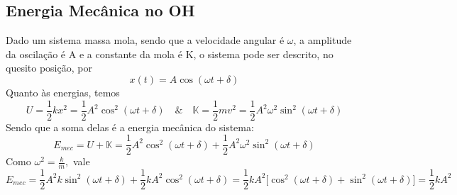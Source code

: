 \documentclass[physicsII_notes.tex]{subfiles}
\begin{document}
\subsection{Energia Mecânica no OH}
Dado um sistema massa mola, sendo que a velocidade angular é \(\omega \), a amplitude da oscilação é A e a constante da mola é K, o sistema pode ser
descrito, no quesito posição, por
\[
	x(t) = A\cos{(\omega t + \delta )}
\]
Quanto às energias, temos
\[
	U = \frac{1}{2}kx^{2} = \frac{1}{2}A^{2}\cos^{2}{(\omega t + \delta )}\quad\&\quad \mathbb{K} = \frac{1}{2}mv^{2} = \frac{1}{2}A^{2}\omega ^{2}\sin^{2}{(\omega t+\delta )}
\]
Sendo que a soma delas é a energia mecânica do sistema:
\[
	E_{mec} = U + \mathbb{K} = \frac{1}{2}A^{2}\cos^{2}{(\omega t + \delta )} + \frac{1}{2}A^{2}\omega ^{2}\sin^{2}{(\omega t+\delta )}
\]
Como \(\omega^{2} = \frac{k}{m},\) vale
\[
	E_{mec} = \frac{1}{2}A^{2}k\sin^{2}{(\omega t + \delta )} + \frac{1}{2}kA^{2}\cos^{2}{(\omega t + \delta )} = \frac{1}{2}kA^{2}\biggl[\cos^{2}{(\omega t+\delta )} + \sin^{2}{(\omega t + \delta )}\biggr] = \frac{1}{2}kA^{2}
\]
\end{document}
